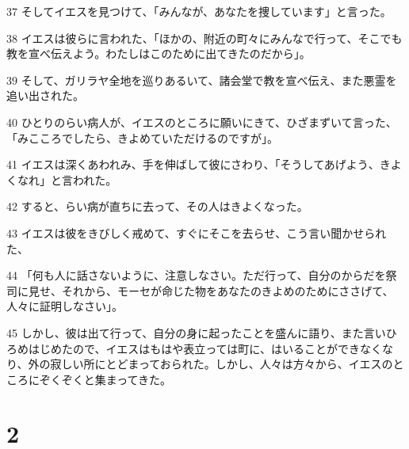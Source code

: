 \par 37 そしてイエスを見つけて、「みんなが、あなたを捜しています」と言った。
\par 38 イエスは彼らに言われた、「ほかの、附近の町々にみんなで行って、そこでも教を宣べ伝えよう。わたしはこのために出てきたのだから」。
\par 39 そして、ガリラヤ全地を巡りあるいて、諸会堂で教を宣べ伝え、また悪霊を追い出された。
\par 40 ひとりのらい病人が、イエスのところに願いにきて、ひざまずいて言った、「みこころでしたら、きよめていただけるのですが」。
\par 41 イエスは深くあわれみ、手を伸ばして彼にさわり、「そうしてあげよう、きよくなれ」と言われた。
\par 42 すると、らい病が直ちに去って、その人はきよくなった。
\par 43 イエスは彼をきびしく戒めて、すぐにそこを去らせ、こう言い聞かせられた、
\par 44 「何も人に話さないように、注意しなさい。ただ行って、自分のからだを祭司に見せ、それから、モーセが命じた物をあなたのきよめのためにささげて、人々に証明しなさい」。
\par 45 しかし、彼は出て行って、自分の身に起ったことを盛んに語り、また言いひろめはじめたので、イエスはもはや表立っては町に、はいることができなくなり、外の寂しい所にとどまっておられた。しかし、人々は方々から、イエスのところにぞくぞくと集まってきた。

\chapter{2}

